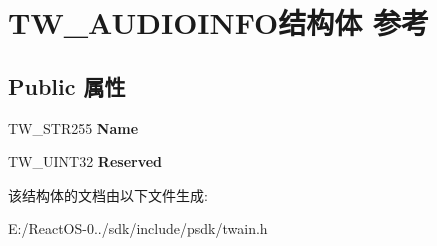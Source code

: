 \hypertarget{struct_t_w___a_u_d_i_o_i_n_f_o}{}\section{T\+W\+\_\+\+A\+U\+D\+I\+O\+I\+N\+F\+O结构体 参考}
\label{struct_t_w___a_u_d_i_o_i_n_f_o}
\subsection*{Public 属性}
\begin{DoxyCompactItemize}
\item 
\mbox{\label{struct_t_w___a_u_d_i_o_i_n_f_o_a08746d032f56848de81145e31d16792f}} 
T\+W\+\_\+\+S\+T\+R255 {\bfseries Name}
\item 
\mbox{\label{struct_t_w___a_u_d_i_o_i_n_f_o_a6f8f2a05f216bdc850252fdab1aeaad4}} 
T\+W\+\_\+\+U\+I\+N\+T32 {\bfseries Reserved}
\end{DoxyCompactItemize}


该结构体的文档由以下文件生成\+:\begin{DoxyCompactItemize}
\item 
E\+:/\+React\+O\+S-\/0../sdk/include/psdk/twain.\+h\end{DoxyCompactItemize}
